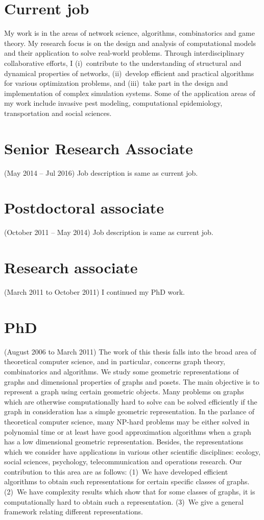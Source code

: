 \documentclass[10pt]{article} %
\begin{document}
\begin{resume}
{\section{\textnormal{{Current job}}}\label{sec:currentJob}
My work is in the areas of network science, algorithms, combinatorics and
game theory. My research focus is on the design and analysis of
computational models and their application to solve real-world problems.
Through interdisciplinary collaborative efforts, I (i)~contribute to the
understanding of structural and dynamical properties of networks,
(ii)~develop efficient and practical algorithms for various optimization
problems, and (iii)~take part in the design and implementation of complex
simulation systems. Some of the application areas of my work include
invasive pest modeling, computational epidemiology, transportation and
social sciences.
\section{\textnormal{{Senior Research Associate}}}\label{sec:sra}
(May 2014 -- Jul 2016) Job description is same as current
job.\smallskip
\section{\textnormal{{Postdoctoral associate}}}\label{sec:postdoc}
(October 2011 -- May 2014) Job description is same as current
job.\smallskip
\section{\textnormal{{Research associate}}}
(March 2011 to October 2011) I continued my PhD work.\smallskip
\section{\textnormal{PhD}}
(August 2006 to March 2011)
The work of this thesis falls into the broad area of theoretical computer
science, and in particular, concerns graph theory, combinatorics and
algorithms. We study some geometric representations of graphs and
dimensional properties of graphs and posets. The main objective is
to represent a graph using certain geometric objects. Many problems
on graphs which are otherwise computationally hard to solve can be
solved efficiently if the graph in consideration has a simple geometric
representation. In the parlance of theoretical computer science, many
NP-hard problems may be either solved in polynomial time or at least
have good approximation algorithms when a graph has a low dimensional
geometric representation. Besides, the representations which we consider
have applications in various other scientific disciplines: ecology,
social sciences, psychology, telecommunication and operations research.
Our contribution to this area are as follows:
(1)~We have developed efficient algorithms to
obtain such representations for certain specific classes of graphs.
(2)~We have complexity results which show that for some classes of graphs, it
is computationally hard to obtain such a representation.
(3)~We give a general framework relating different representations.
}
\end{resume}
\end{document}
